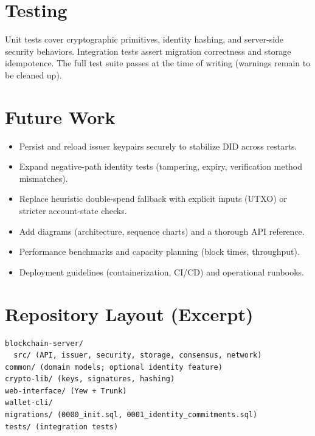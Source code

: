 \documentclass[12pt,a4paper]{report}
\begin{document}
\chapter{Testing}
Unit tests cover cryptographic primitives, identity hashing, and server-side security behaviors. Integration tests assert migration correctness and storage idempotence. The full test suite passes at the time of writing (warnings remain to be cleaned up).

\chapter{Future Work}
\begin{itemize}[noitemsep]
  \item Persist and reload issuer keypairs securely to stabilize DID across restarts.
  \item Expand negative-path identity tests (tampering, expiry, verification method mismatches).
  \item Replace heuristic double-spend fallback with explicit inputs (UTXO) or stricter account-state checks.
  \item Add diagrams (architecture, sequence charts) and a thorough API reference.
  \item Performance benchmarks and capacity planning (block times, throughput).
  \item Deployment guidelines (containerization, CI/CD) and operational runbooks.
\end{itemize}

\appendix
\chapter{Repository Layout (Excerpt)}
\begin{verbatim}
blockchain-server/
  src/ (API, issuer, security, storage, consensus, network)
common/ (domain models; optional identity feature)
crypto-lib/ (keys, signatures, hashing)
web-interface/ (Yew + Trunk)
wallet-cli/
migrations/ (0000_init.sql, 0001_identity_commitments.sql)
tests/ (integration tests)
\end{verbatim}

% 
% 
\end{document}
